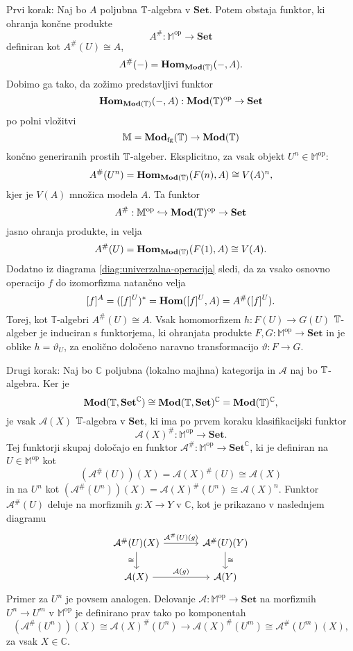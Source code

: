 \documentclass[../kategoricna_logika.tex]{subfiles}
\begin{document}
\begin{dokaz}
  Prvi korak: Naj bo $A$ poljubna $\mathbb{T}$-algebra v $\mathbf{Set}$. Potem obstaja funktor,
  ki ohranja končne produkte
  \[ A^{\#}: \mathbb{M}^{\mathrm{op}} \to \mathbf{Set}\]
  definiran kot $A^{\#}(U) \cong A$,
  \[ A^{\#}(-) = \mathbf{Hom}_{\mathbf{Mod}(\mathbb{T})}(-,A).\]
  Dobimo ga tako, da zožimo predstavljivi funktor
  \[ \mathbf{Hom}_{\mathbf{Mod}(\mathbb{T})}(-,A) : \mathbf{Mod}(\mathbb{T})^{\mathrm{op}} \to \mathbf{Set}\]
  po polni vložitvi
  \[ \mathbb{M} = \mathbf{Mod}_{\mathrm{fg}}(\mathbb{T}) \to \mathbf{Mod}(\mathbb{T})\]
  končno generiranih prostih $\mathbb{T}$-algeber. Eksplicitno, za vsak objekt
  $U^n \in \mathbb{M}^{\mathrm{op}}$:
  \[ A^{\#}(U^n) = \mathbf{Hom}_{\mathbf{Mod}(\mathbb{T})}(F(n), A) \cong V(A)^{n}, \]
  kjer je $V(A)$ množica modela $A$. Ta funktor
  \[ A^{\#} : \mathbb{M}^{\mathrm{op}} \hookrightarrow \mathbf{Mod}(\mathbb{T})^{\mathrm{op}} \to \mathbf{Set}\]
  jasno ohranja produkte, in velja
  \[ A^{\#}(U) = \mathbf{Hom}_{\mathbf{Mod}(\mathbb{T})}(F(1), A) \cong V(A).\]
  Dodatno iz diagrama \eqref{diag:univerzalna-operacija} sledi, da za vsako osnovno operacijo $f$
  do izomorfizma natančno velja
  \[ [f]^A = ([f]^U)^{*} = \mathbf{Hom}([f]^U,A) = A^{\#}([f]^U).\]
  Torej, kot $\mathbb{T}$-algebri $A^{\#}(U) \cong A$.
  Vsak homomorfizem $h : F(U) \to G(U)$ $\mathbb{T}$-algeber
  je induciran s funktorjema, ki ohranjata produkte
  ${F,G : \mathbb{M}^{\mathrm{op}} \to \mathbf{Set}}$
  in je oblike $h = \vartheta_U$, za enolično določeno naravno transformacijo $\vartheta : F \to G$.

  Drugi korak: Naj bo $\mathbb{C}$ poljubna (lokalno majhna) kategorija in $\mathcal{A}$ naj bo
  $\mathbb{T}$-algebra. Ker je
  \[ \mathbf{Mod}(\mathbb{T}, \mathbf{Set}^{\mathbb{C}}) \cong
    \mathbf{Mod}(\mathbb{T}, \mathbf{Set})^{\mathbb{C}} = \mathbf{Mod}(\mathbb{T})^{\mathbb{C}},\]
  je vsak $\mathcal{A}(X)$ $\mathbb{T}$-algebra v $\mathbf{Set}$,
  ki ima po prvem koraku klasifikacijski funktor
  \[ \mathcal{A}(X)^{\#} : \mathbb{M}^{\mathrm{op}} \to \mathbf{Set}.\]
  Tej funktorji skupaj določajo en funktor
  $\mathcal{A}^{\#} : \mathbb{M}^{\mathrm{op}} \to \mathbf{Set}^{\mathbb{C}}$,
  ki je definiran na $U \in \mathbb{M}^{\mathrm{op}}$ kot
  \[ (\mathcal{A}^{\#}(U))(X) = \mathcal{A}(X)^{\#}(U) \cong \mathcal{A}(X)\]
  in na $U^n$ kot $(\mathcal{A}^{\#}(U^{n}))(X) = \mathcal{A}(X)^{\#}(U^n) \cong \mathcal{A}(X)^n$.
  Funktor ${\mathcal{A}^{\#}(U)}$ deluje na morfizmih $g : X \to Y$ v
  $\mathbb{C}$, kot je prikazano v naslednjem diagramu
  \begin{equation*}
    \begin{tikzcd}[column sep=large]
      \mathcal{A}^{\#}(U)(X) \ar[d, "\cong"'] \ar[r, "{\mathcal{A}^{\#}(U)(g)}"] &
      \mathcal{A}^{\#}(U)(Y) \ar[d, "\cong"] \\
      \mathcal{A}(X) \ar[r, "{\mathcal{A}(g)}"] & \mathcal{A}(Y)
    \end{tikzcd}
  \end{equation*}
  Primer za $U^n$ je povsem analogen. Delovanje
  $\mathcal{A} : \mathbb{M}^{\mathrm{op}} \to \mathbf{Set}$ na morfizmih $U^n \to U^m$
  v $\mathbb{M}^{\mathrm{op}}$ je definirano prav tako po komponentah
  \[ (\mathcal{A}^{\#}(U^n))(X) \cong \mathcal{A}(X)^{\#}(U^n) \to
    \mathcal{A}(X)^{\#}(U^m) \cong \mathcal{A}^{\#}(U^m)(X),\]
  za vsak $X \in \mathbb{C}$.


\end{dokaz}
\end{document}
